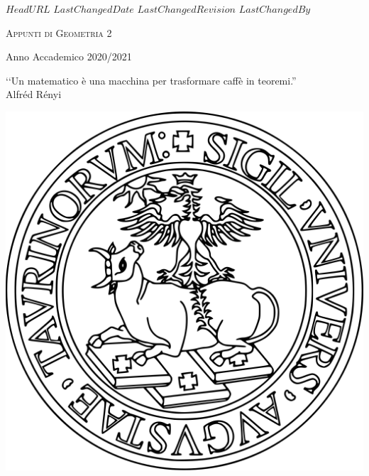 \svnidlong
{$HeadURL$}
{$LastChangedDate$}
{$LastChangedRevision$}
{$LastChangedBy$}

\thispagestyle{titlepage}

\begin{center}
  \newlength{\parSepLength}
  \setlength{\parSepLength}{10ex}

  \Large
  \centering

  \thinRule\par
  \par\vspace{0.15\parSepLength}
  \begin{minipage}{\textwidth}
    \centering
    \fontsize{40pt}{36pt}\selectfont\titleColor\scshape
    Appunti di Geometria 2
  \end{minipage}
  \par\vspace{0.25\parSepLength}
  \par\thinRule

  \vspace{0.125\parSepLength}

  \begin{minipage}{\textwidth}
    \centering
    \small
    Anno Accademico 2020/2021
  \end{minipage}

  \vspace{0.225\parSepLength}
  
    \begin{minipage}{\textwidth}
  	\centering
  	‘‘Un matematico è una macchina per trasformare caffè in teoremi.''\\
  	Alfréd Rényi
  \end{minipage}

  \vfill

  \begin{minipage}{\textwidth}
    \centering
\begin{center}
	\includegraphics[width=0.25\linewidth]{images/Unito-logo}
\end{center}

  \end{minipage}


\end{center}
